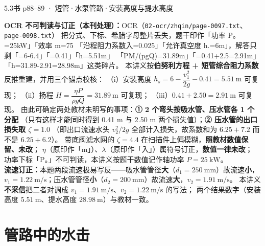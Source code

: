 \begin{liti}{5.3}{书 p88--89 · 短管·水泵管路·安装高度与提水高度}
\begin{tishi}
\textbf{OCR 不可判读与订正（本刊处理）：}OCR（\texttt{02-ocr/zhqin/page-0097.txt}、\texttt{page-0098.txt}）
把分式、下标、希腊字母整片丢失，题干印作「功率 P。=25kW」「效率 m=75%
「沿程阻力系数入=0.025」「允许真空度 h.=6m」，解答只剩「=6-6.4」「=0.41」「h=5.51m」
「PM/(pgQ)=31.89m」「=0.41+2.5=2.91m」「h=31.89-2.91=28.98m」这类碎片。
本讲义按\textbf{伯努利方程 + 短管综合阻力系数}反推重建，并用三个锚点校核：
（i）安装高度 $h_s=6-\dfrac{v_1^2}{2g}-0.41=5.51\ \mathrm{m}$ 可复现；
（ii）扬程 $H=\dfrac{\eta P}{\rho gQ}=31.89\ \mathrm{m}$ 可复现；
（iii）$0.41+2.50=2.91\ \mathrm{m}$ 可复现。
由此可确定两处教材未明写的事项：\textbf{① 2 个弯头按吸水管、压水管各 1 个分配}
（只有这样才能同时得到 0.41 m 与 2.50 m 两个损失值）；\textbf{② 压水管的出口损失取 $\zeta=1.0$}
（即出口流速水头 $v_2^2/2g$ 全部计入损失，故系数和为 $6.25+7.2$ 而不是 $6.25+6.2$）。
带底阀滤水网的 $\zeta=4.4$ 在扫描件上偏模糊，\textbf{照教材数值保留、未改}；
$\eta$（原印作「m」）、$\lambda$（原印作「入」）属符号订正，\textbf{数值一律未改}；
功率下标「P。」不可判读，本讲义按题干数值记作轴功率 $P=25\ \mathrm{kW}$。\\
\textbf{流速订正：}本题两段流速极易写反——吸水管管径\textbf{大}（$d_1=250\ \mathrm{mm}$）故流速\textbf{小}，
$v_1=1.22\ \mathrm{m/s}$；压水管管径\textbf{小}（$d_2=200\ \mathrm{mm}$）故流速\textbf{大}，$v_2=1.91\ \mathrm{m/s}$。
本讲义\textbf{不采信}把二者对调成 $v_1=1.91\ \mathrm{m/s}$、$v_2=1.22\ \mathrm{m/s}$ 的写法；
两个结果数字（安装高度 $5.51\ \mathrm{m}$、提水高度 $28.98\ \mathrm{m}$）与教材一致。
\end{tishi}
\end{liti}

\section{管路中的水击}


